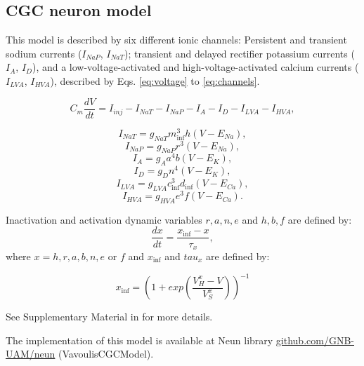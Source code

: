 \subsection{CGC neuron model}
 This model is described by six different ionic channels: Persistent and transient sodium currents ($I_{NaP}$, $I_{NaT}$); transient and delayed rectifier potassium currents ($I_A$, $I_D$), and a low-voltage-activated and high-voltage-activated calcium currents ($I_{LVA}$, $I_{HVA}$), described by Eqs. \ref{eq:voltage} to \ref{eq:channels}. 
 
  \begin{equation}
 	C_m\frac{dV}{dt} = I_{inj} - I_{NaT} - I_{NaP} - I_{A} - I_{D} - I_{LVA} - I_{HVA},
 	\label{eq:voltage}
 \end{equation}
 
 \begin{equation}
 	I_{NaT} = g_{NaT} m_{{\inf}}^3 h (V - E_{Na}),
 \end{equation}
 \begin{equation}
 	I_{NaP} = g_{NaP} r^3 (V - E_{Na}),
 \end{equation}
 \begin{equation}
 	I_{A} = g_{A} a^4 b (V - E_{K}),
 \end{equation}
 \begin{equation}
 	I_{D} = g_{D} n^4 (V - E_{K}),
 \end{equation}
 \begin{equation}
 	I_{LVA} = g_{LVA} c_{{\inf}}^3 d_{{\inf}} (V - E_{Ca}),
 \end{equation}
 \begin{equation}
 	I_{HVA} = g_{HVA} e^3 f (V - E_{Ca}).
 	\label{eq:channels}
 \end{equation}

Inactivation and activation dynamic variables $r,a,n,e$ and $h,b,f$ are defined by:
\begin{equation}
	\frac{dx}{dt} = \frac{x_{\inf}-x}{\tau_x},
	\end{equation}
where $x = h,r,a,b,n,e$ or $f$ and $x_{\inf}$ and $tau_x$ are defined by:

\begin{equation}
	x_{\inf} = {(1+exp(\frac{V_H^x-V}{V_S^x}))}^{-1}
\end{equation}

See Supplementary Material in \cite{vavoulis_balanced_2010} for more details. 

The implementation of this model is available at Neun library \href{https://github.com/GNB-UAM/neun}{github.com/GNB-UAM/neun} (VavoulisCGCModel).


